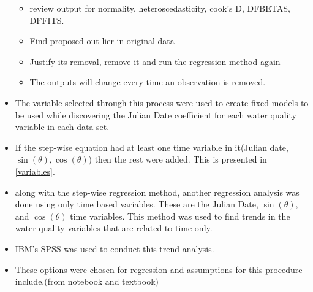 \begin{itemize}
\begin{itemize}
	\item review output  for normality, heteroscedasticity, cook's D, DFBETAS, DFFITS.
	\item Find proposed out lier in original data
	\item Justify its removal, remove it and run the regression method again
	\item The outputs will change every time an observation is removed.
	\end{itemize}
	
	\item The variable selected through this process were used to create fixed models to be used while discovering the Julian Date coefficient for each water quality variable in each data set.
	\item If the step-wise equation had at least one time variable in it(Julian date, $\sin(\theta), \cos(\theta)$) then the rest were added.  This is presented in \autoref{variables}.
	\item along with the step-wise regression method, another regression analysis was done using only time based variables.  These are the Julian Date, $\sin(\theta)$, and $\cos(\theta)$ time variables.  This method was used to find trends in the water quality variables that are related to time only.		
        \item IBM's SPSS was used to conduct this trend analysis.
        \item These options were chosen for regression and assumptions for this procedure include.(from notebook and textbook)
\end{itemize}

